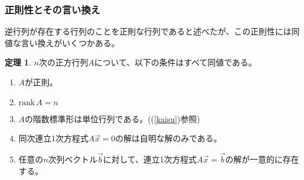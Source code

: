 \documentclass[10pt]{jsreport}
\theoremstyle{definition}%
\newtheorem{thm}{定理}[section]%
\newcommand{\vc}[1]{\overrightarrow{#1}}%
\newcommand{\rank}{\mathrm{rank\,}}
\numberwithin{equation}{section}%
\begin{document}
\subsubsection{正則性とその言い換え}
逆行列が存在する行列のことを正則な行列であると述べたが、この正則性には同値な言い換えがいくつかある。
\begin{screen}
  \begin{thm}
    $n$次の正方行列$A$について、以下の条件はすべて同値である。
    \begin{enumerate}
      \item $A$が正則。
      \item $\rank A=n$
      \item $A$の階数標準形は単位行列である。((\ref{kaisu})参照)
      \item 同次連立1次方程式$A\vc{x}=0$の解は自明な解のみである。
      \item 任意の$n$次列ベクトル$\vc{b}$に対して、連立1次方程式$A\vc{x}=\vc{b}$の解が一意的に存在する。
    \end{enumerate}
  \end{thm}
\end{screen}
\end{document}
